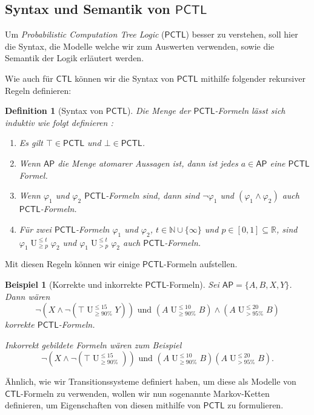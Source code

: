 \documentclass{lni}
\theoremstyle{def_style}
\newtheorem{definition}{Definition}[section]
\theoremstyle{break}
\newtheorem{example}{Beispiel}
\newcommand{\UEqual}[4]{#1\operatorname{U}^{\leq #2}_{\geq #3}#4}
\newcommand{\UStrict}[4]{#1\operatorname{U}^{\leq #2}_{> #3}#4}
\newcommand{\CTL}{\mathsf{CTL}}
\newcommand{\PCTL}{\mathsf{PCTL}}
\begin{document}
\subsection{Syntax und Semantik von $\PCTL$}

Um \textit{Probabilistic Computation Tree Logic} ($\PCTL$) besser zu verstehen, soll hier die Syntax, die Modelle welche wir zum Auswerten verwenden, sowie die Semantik der Logik erläutert werden.

Wie auch für $\CTL$ können wir die Syntax von  $\PCTL$ mithilfe folgender rekursiver Regeln definieren:
\begin{definition}[Syntax von $\PCTL$]
	Die Menge der $\PCTL$-Formeln lässt sich induktiv wie folgt definieren \cite{hansson1994logic}:
	\begin{enumerate}
		\item Es gilt $\top\in \PCTL$ und $\bot\in \PCTL$.
		\item Wenn $\mathsf{AP}$ die Menge atomarer Aussagen ist, dann ist jedes $a\in \mathsf{AP}$ eine $\PCTL$ Formel.
		\item Wenn $\varphi_1$ und $\varphi_2$ $\PCTL$-Formeln sind, dann sind $\neg\varphi_1$ und $(\varphi_1\land \varphi_2)$ auch $\PCTL$-Formeln.
		\item Für zwei $\PCTL$-Formeln $\varphi_1$ und $\varphi_2$, $t\in \mathbb{N}\cup\{\infty\}$ und $p\in [0,1]\subseteq\mathbb{R}$, sind $\UEqual{\varphi_1}{t}{p}{\varphi_2}$ und $\UStrict{\varphi_1}{t}{p}{\varphi_2}$ auch $\PCTL$-Formeln.
	\end{enumerate}
\end{definition}
Mit diesen Regeln können wir einige $\PCTL$-Formeln aufstellen.
\begin{example}[Korrekte und inkorrekte $\PCTL$-Formeln]
	Sei $\mathsf{AP}=\{A,B,X,Y\}$. Dann wären 
	$$\neg(X \land \neg(\UEqual{\top}{15}{90\%}{Y})) \text{ und } (\UEqual{A}{10}{90\%}{B}) \land (\UStrict{A}{20}{95\%}{B})$$ 
	korrekte $\PCTL$-Formeln.
	
	Inkorrekt gebildete Formeln wären zum Beispiel $$\neg(X \land \neg(\UEqual{\top}{15}{90\%}{})) \text{ und } (\UEqual{A}{10}{90\%}{B})(\UStrict{A}{20}{95\%}{B}).$$
\end{example}

Ähnlich, wie wir Transitionssysteme definiert haben, um diese als Modelle von $\CTL$-Formeln zu verwenden, wollen wir nun sogenannte Markov-Ketten definieren, um Eigenschaften von diesen mithilfe von $\PCTL$ zu formulieren.
\end{document}
